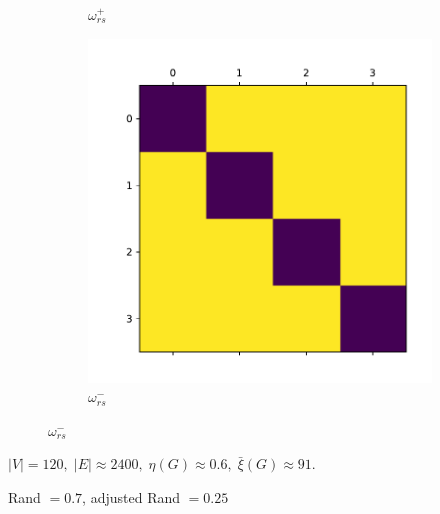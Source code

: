 \documentclass{beamer}
\begin{document}
\begin{frame}[c]
\begin{figure}
\begin{center}
\begin{subfigure}[b]{0.3\textwidth}
				\caption{$\omega ^{+} _{rs} $}
				\label{fig:out/synthetic/omega_positive1.pdf}
			\end{subfigure}
			\begin{subfigure}[b]{0.3\textwidth}
				\centering
				\includegraphics[width=\textwidth]{out/synthetic/model2_omega_negative4.pdf}
				\caption{$\omega ^{-} _{rs} $}
				\label{fig:}
			\end{subfigure}
		\end{center}
	\end{figure}

	$|V| = 120, \; |E| \approx 2400, \; \eta(G) \approx 0.6, \; \bar{\xi}(G)
		\approx 91$.

	Rand $= 0.7$, adjusted Rand $= 0.25$
\end{frame}
\end{document}
